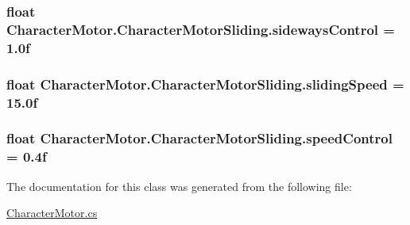 \subsubsection[{sideways\+Control}]{\setlength{\rightskip}{0pt plus 5cm}float Character\+Motor.\+Character\+Motor\+Sliding.\+sideways\+Control = 1.\+0f}\label{class_character_motor_1_1_character_motor_sliding_ae33f7893434835b8c77d93be5b825fe4}
\hypertarget{class_character_motor_1_1_character_motor_sliding_a737e4971b2fa4f4d8a59beabb9b4d32a}{}
\subsubsection[{sliding\+Speed}]{\setlength{\rightskip}{0pt plus 5cm}float Character\+Motor.\+Character\+Motor\+Sliding.\+sliding\+Speed = 15.\+0f}\label{class_character_motor_1_1_character_motor_sliding_a737e4971b2fa4f4d8a59beabb9b4d32a}
\hypertarget{class_character_motor_1_1_character_motor_sliding_af46b4c13765ed9e3243ac3d977094692}{}
\subsubsection[{speed\+Control}]{\setlength{\rightskip}{0pt plus 5cm}float Character\+Motor.\+Character\+Motor\+Sliding.\+speed\+Control = 0.\+4f}\label{class_character_motor_1_1_character_motor_sliding_af46b4c13765ed9e3243ac3d977094692}


The documentation for this class was generated from the following file\+:\begin{DoxyCompactItemize}
\item 
\hyperlink{_character_motor_8cs}{Character\+Motor.\+cs}\end{DoxyCompactItemize}

